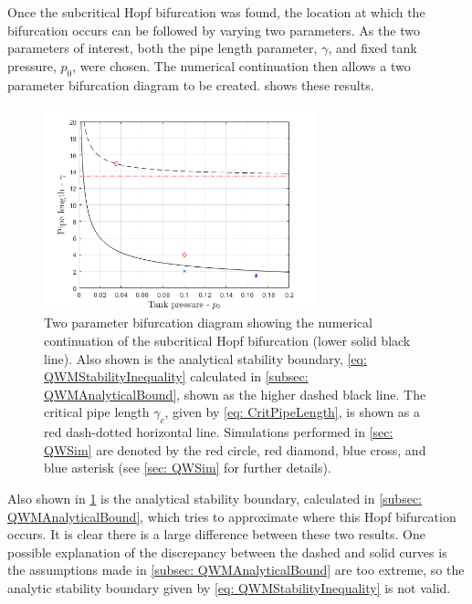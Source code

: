 Once the subcritical Hopf bifurcation was found, the location at which the bifurcation occurs can be followed by varying two parameters. As the two parameters of interest, both the pipe length parameter, $\gamma$, and fixed tank pressure, $p_0$, were chosen. The numerical continuation then allows a two parameter bifurcation diagram
to be created.  shows these results.
% 
~
\begin{figure}[ht]
    \centering
    \includegraphics[width=0.7\textwidth]{Figures/BifurcationDiagram.png}
    \caption{Two parameter bifurcation diagram showing the numerical continuation of the subcritical Hopf bifurcation (lower solid black line). Also shown is the analytical stability boundary, \cref{eq: QWMStabilityInequality} calculated in \cref{subsec: QWMAnalyticalBound}, shown as the higher dashed black line. The critical pipe length $\gamma_c$, given by \cref{eq: CritPipeLength}, is shown as a red dash-dotted horizontal line. Simulations performed in \cref{sec: QWSim} are denoted by the red circle, red diamond, blue cross, and blue asterisk (see \cref{sec: QWSim} for further details).}
    \label{fig: BifurcationDiagram}
\end{figure}
% 

Also shown in \cref{fig: BifurcationDiagram} is the analytical stability boundary, calculated in \cref{subsec: QWMAnalyticalBound}, which tries to approximate where this Hopf bifurcation occurs. It is clear there is a large difference between these two results. One possible explanation of the discrepancy between the dashed and solid curves is the assumptions made in \cref{subsec: QWMAnalyticalBound} are too extreme, so the analytic stability boundary given by \cref{eq: QWMStabilityInequality} is not valid.


